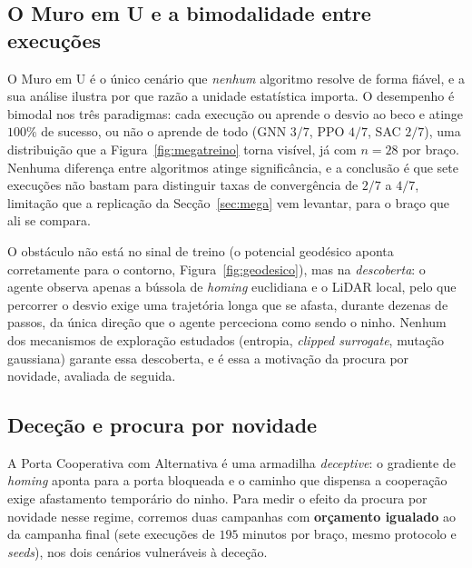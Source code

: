 \documentclass[final,5p,times,twocolumn,authoryear]{elsarticle}
\begin{document}
\subsection{O Muro em U e a bimodalidade entre execuções}
O Muro em U é o único cenário que \emph{nenhum} algoritmo resolve de forma fiável,
e a sua análise ilustra por que razão a unidade estatística importa. O desempenho
é bimodal nos três paradigmas: cada execução ou aprende o desvio ao beco e atinge
$100\%$ de sucesso, ou não o aprende de todo (GNN $3/7$, PPO $4/7$, SAC $2/7$),
uma distribuição que a Figura~\ref{fig:megatreino} torna visível, já com
$n=28$ por braço. Nenhuma diferença entre algoritmos atinge significância, e a
conclusão é que sete execuções não bastam para distinguir taxas de
convergência de $2/7$ a $4/7$, limitação que a replicação da
Secção~\ref{sec:mega} vem levantar, para o braço que ali se compara.

O obstáculo não está no sinal de treino (o potencial geodésico aponta
corretamente para o contorno, Figura~\ref{fig:geodesico}), mas na
\emph{descoberta}: o agente observa apenas a bússola de \emph{homing} euclidiana e
o LiDAR local, pelo que percorrer o desvio exige uma trajetória longa que se
afasta, durante dezenas de passos, da única direção que o agente perceciona como
sendo o ninho. Nenhum dos mecanismos de exploração estudados (entropia,
\emph{clipped surrogate}, mutação gaussiana) garante essa descoberta, e é essa a
motivação da procura por novidade, avaliada de seguida.

\subsection{Deceção e procura por novidade}
A Porta Cooperativa com Alternativa é uma armadilha \emph{deceptive}: o gradiente
de \emph{homing} aponta para a porta bloqueada e o caminho que dispensa a
cooperação exige afastamento temporário do ninho. Para medir o efeito da procura por novidade
\citep{lehman2011abandoning} nesse regime, corremos duas campanhas com
\textbf{orçamento igualado} ao da campanha final (sete execuções de $195$ minutos
por braço, mesmo protocolo e \emph{seeds}), nos dois cenários vulneráveis à
deceção.
\end{document}
